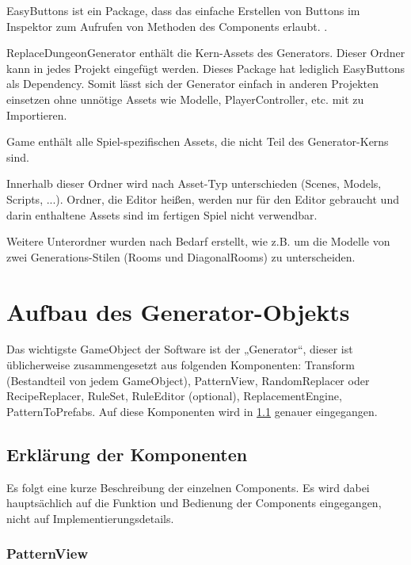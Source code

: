 EasyButtons ist ein Package, dass das einfache Erstellen von Buttons im Inspektor zum Aufrufen von Methoden des Components erlaubt. .

ReplaceDungeonGenerator enthält die Kern-Assets des Generators. Dieser Ordner kann in jedes Projekt eingefügt werden. Dieses Package hat lediglich EasyButtons als Dependency. Somit lässt sich der Generator einfach in anderen Projekten einsetzen ohne unnötige Assets wie Modelle, PlayerController, etc. mit zu Importieren.

Game enthält alle Spiel-spezifischen Assets, die nicht Teil des Generator-Kerns sind.

Innerhalb dieser Ordner wird nach Asset-Typ unterschieden (Scenes, Models, Scripts, ...). Ordner, die Editor heißen, werden nur für den Editor gebraucht und darin enthaltene Assets sind im fertigen Spiel nicht verwendbar.

Weitere Unterordner wurden nach Bedarf erstellt, wie z.B. um die Modelle von zwei Generations-Stilen (Rooms und DiagonalRooms) zu unterscheiden.

\section{Aufbau des Generator-Objekts}

Das wichtigste GameObject der Software ist der „Generator“, dieser ist üblicherweise zusammengesetzt aus folgenden Komponenten: 
Transform (Bestandteil von jedem GameObject), PatternView, RandomReplacer oder RecipeReplacer, RuleSet, RuleEditor (optional), ReplacementEngine, PatternToPrefabs. Auf diese Komponenten wird in \ref{ss.komponenten} genauer eingegangen.


\subsection{Erklärung der Komponenten}\label{ss.komponenten}

Es folgt eine kurze Beschreibung der einzelnen Components. Es wird dabei hauptsächlich auf die Funktion und Bedienung der Components eingegangen, nicht auf Implementierungsdetails.

\subsubsection{PatternView}\label{sss.patternView}

